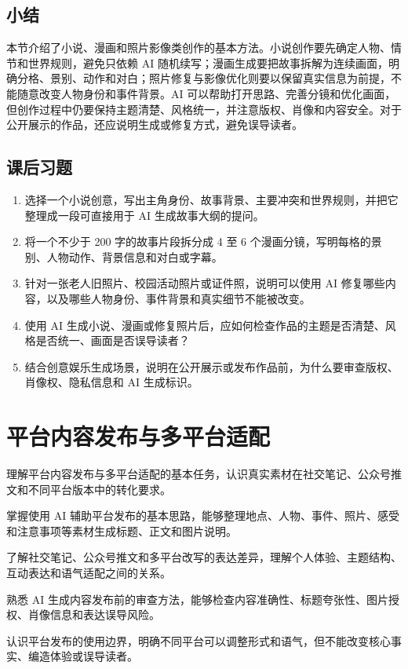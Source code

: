 \subsection*{小结}
本节介绍了小说、漫画和照片影像类创作的基本方法。小说创作要先确定人物、情节和世界规则，避免只依赖 AI 随机续写；漫画生成要把故事拆解为连续画面，明确分格、景别、动作和对白；照片修复与影像优化则要以保留真实信息为前提，不能随意改变人物身份和事件背景。AI 可以帮助打开思路、完善分镜和优化画面，但创作过程中仍要保持主题清楚、风格统一，并注意版权、肖像和内容安全。对于公开展示的作品，还应说明生成或修复方式，避免误导读者。
\bigskip

\subsection*{课后习题}
\begin{enumerate}
\setlength{\itemsep}{6pt}

\item 选择一个小说创意，写出主角身份、故事背景、主要冲突和世界规则，并把它整理成一段可直接用于 AI 生成故事大纲的提问。

\item 将一个不少于 200 字的故事片段拆分成 4 至 6 个漫画分镜，写明每格的景别、人物动作、背景信息和对白或字幕。

\item 针对一张老人旧照片、校园活动照片或证件照，说明可以使用 AI 修复哪些内容，以及哪些人物身份、事件背景和真实细节不能被改变。

\item 使用 AI 生成小说、漫画或修复照片后，应如何检查作品的主题是否清楚、风格是否统一、画面是否误导读者？

\item 结合创意娱乐生成场景，说明在公开展示或发布作品前，为什么要审查版权、肖像权、隐私信息和 AI 生成标识。

\end{enumerate}

\newpage

\section{平台内容发布与多平台适配}

\begin{sectionkeypoints}
\item 理解平台内容发布与多平台适配的基本任务，认识真实素材在社交笔记、公众号推文和不同平台版本中的转化要求。
\item 掌握使用 AI 辅助平台发布的基本思路，能够整理地点、人物、事件、照片、感受和注意事项等素材生成标题、正文和图片说明。
\item 了解社交笔记、公众号推文和多平台改写的表达差异，理解个人体验、主题结构、互动表达和语气适配之间的关系。
\item 熟悉 AI 生成内容发布前的审查方法，能够检查内容准确性、标题夸张性、图片授权、肖像信息和表达误导风险。
\item 认识平台发布的使用边界，明确不同平台可以调整形式和语气，但不能改变核心事实、编造体验或误导读者。
\end{sectionkeypoints}

